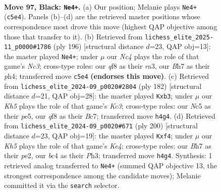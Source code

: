 \documentclass[11pt]{article}
\begin{document}
\clearpage

\begin{figure}[p]\centering
\begin{subfigure}{0.46\textwidth}\centering
\resizebox{\linewidth}{!}{%
\newchessgame
\chessboard[
  setfen={5Q2/2N4b/8/2n5/1pB3Pk/8/5K2/8 b - - 0 97},
  showmover=false,
  pgfstyle=straightmove, color=movearrow, markmove={c5-e4}
]}
\caption{}
\end{subfigure}\hfill
\begin{subfigure}{0.46\textwidth}\centering
\resizebox{\linewidth}{!}{%
\newchessgame
\chessboard[
  setfen={2B5/8/8/2k4b/5p1p/r1N4P/5K2/8 w - - 6 99},
  showmover=false,
  pgfstyle=straightmove, color=movearrow, markmove={c3-e4}
]}
\caption{}
\end{subfigure}
\\[4pt]
\begin{subfigure}{0.46\textwidth}\centering
\resizebox{\linewidth}{!}{%
\newchessgame
\chessboard[
  setfen={8/2B5/5P2/4p2b/4k3/1pK5/8/8 w - - 1 92},
  showmover=false,
  pgfstyle=straightmove, color=movearrow, markmove={c3-b3}
]}
\caption{}
\end{subfigure}\hfill
\begin{subfigure}{0.46\textwidth}\centering
\resizebox{\linewidth}{!}{%
\newchessgame
\chessboard[
  setfen={8/6k1/8/7p/1B2Kp2/7P/4p3/8 w - - 2 101},
  showmover=false,
  pgfstyle=straightmove, color=movearrow, markmove={e4-f4}
]}
\caption{}
\end{subfigure}
\caption{\textbf{Move 97, Black: \texttt{Ne4+}.} (a) Our position; Melanie plays \texttt{Ne4+} (\texttt{c5e4}). Panels (b)--(d) are the retrieved master positions whose correspondence most drove this move (highest QAP objective among those that transfer to it). (b) Retrieved from \texttt{lichess\_elite\_2025-11\_p0000\#1786} (ply 196) [structural distance $d$=23, QAP obj=13]: the master played \texttt{Ne4+}; under $\mu$ our \emph{Nc4} plays the role of that game's \emph{Nc3}; cross-type roles: our \emph{q}f8 as their \emph{r}a3, our \emph{B}h7 as their \emph{p}h4; transferred move \texttt{c5e4} \textbf{(endorses this move)}. (c) Retrieved from \texttt{lichess\_elite\_2024-09\_p0020\#2804} (ply 182) [structural distance $d$=21, QAP obj=28]: the master played \texttt{Kxb3}; under $\mu$ our \emph{Kh5} plays the role of that game's \emph{Kc3}; cross-type roles: our \emph{N}c5 as their \emph{p}e5, our \emph{q}f8 as their \emph{B}c7; transferred move \texttt{h4g4}. (d) Retrieved from \texttt{lichess\_elite\_2024-09\_p0020\#671} (ply 200) [structural distance $d$=23, QAP obj=19]: the master played \texttt{Kxf4}; under $\mu$ our \emph{Kh5} plays the role of that game's \emph{Ke4}; cross-type roles: our \emph{B}h7 as their \emph{p}e2, our \emph{b}c4 as their \emph{P}h3; transferred move \texttt{h4g4}. Synthesis: 1 retrieved analog transferred to \texttt{Ne4+} (summed QAP objective 13, the strongest correspondence among the candidate moves); Melanie committed it via the \texttt{search} selector.}
\label{fig:thought-m193}
\end{figure}
\end{document}
